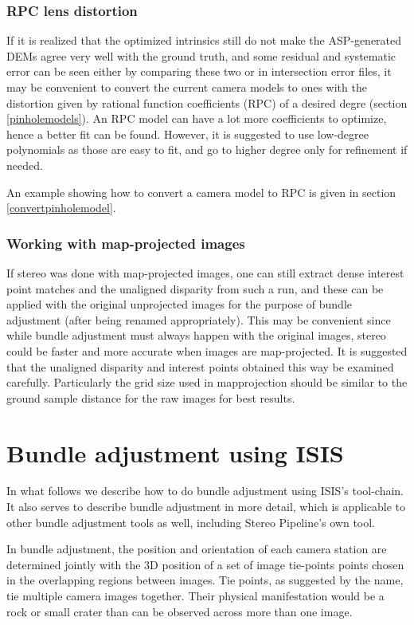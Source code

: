\subsubsection{RPC lens distortion} 
If it is realized that the optimized intrinsics still do not make the
ASP-generated DEMs agree very well with the ground truth, and some
residual and systematic error can be seen either by comparing these two
or in intersection error files, it may be convenient to convert the
current camera models to ones with the distortion given by rational
function coefficients (RPC) of a desired degre (section
\ref{pinholemodels}). An RPC model can have a lot more coefficients to
optimize, hence a better fit can be found. However, it is suggested to 
use low-degree polynomials as those are easy to fit, and go to higher
degree only for refinement if needed. 

An example showing how to convert a camera model to RPC is given in
section \ref{convertpinholemodel}.

\subsubsection{Working with map-projected images}

If stereo was done with map-projected images, one can still extract
dense interest point matches and the unaligned disparity from such a
run, and these can be applied with the original unprojected images for
the purpose of bundle adjustment (after being renamed
appropriately). This may be convenient since while bundle adjustment
must always happen with the original images, stereo could be faster and
more accurate when images are map-projected. It is suggested that the
unaligned disparity and interest points obtained this way be examined
carefully. Particularly the grid size used in mapprojection should be
similar to the ground sample distance for the raw images for best
results.

\section{Bundle adjustment using ISIS}

In what follows we describe how to do bundle adjustment using
\ac{ISIS}'s tool-chain. It also serves to describe bundle adjustment in more
detail, which is applicable to other bundle adjustment tools as well,
including Stereo Pipeline's own tool.

In bundle adjustment, the position and orientation of each camera
station are determined jointly with the 3D position of a set of image
tie-points points chosen in the overlapping regions between
images. Tie points, as suggested by the name, tie multiple camera images
together. Their physical manifestation would be a rock or small crater
than can be observed across more than one image.

